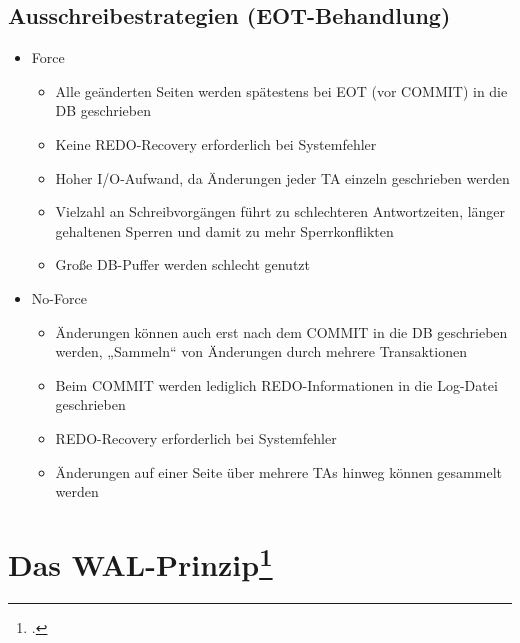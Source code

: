 \documentclass{lehramt-informatik-haupt}
\begin{document}
%

\subsection{Ausschreibestrategien (EOT-Behandlung)}

\begin{itemize}

\item Force

\begin{itemize}
\item Alle geänderten Seiten werden spätestens bei EOT (vor COMMIT) in
die DB geschrieben

\item Keine REDO-Recovery erforderlich bei Systemfehler

\item Hoher I/O-Aufwand, da Änderungen jeder TA einzeln geschrieben
werden

\item Vielzahl an Schreibvorgängen führt zu schlechteren Antwortzeiten,
länger gehaltenen Sperren und damit zu mehr Sperrkonflikten

\item Große DB-Puffer werden schlecht genutzt
\end{itemize}

\item No-Force

\begin{itemize}
\item Änderungen können auch erst nach dem COMMIT in die DB geschrieben
werden, „Sammeln“ von Änderungen durch mehrere Transaktionen

\item Beim COMMIT werden lediglich REDO-Informationen in die Log-Datei
geschrieben

\item REDO-Recovery erforderlich bei Systemfehler

\item Änderungen auf einer Seite über mehrere TAs hinweg können
gesammelt werden
\end{itemize}
\end{itemize}

\section{Das WAL-Prinzip\footcite[Kapitel 10.3.5 Seite 318]{kemper}}
\end{document}
